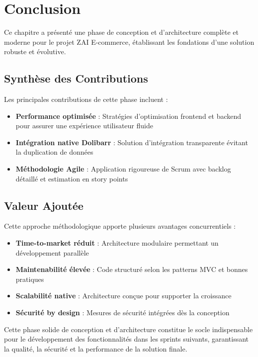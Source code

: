 \documentclass[12pt,a4paper]{report}
\begin{document}
\section{Conclusion}
Ce chapitre a présenté une phase de conception et d'architecture complète et moderne pour le projet ZAI E-commerce, établissant les fondations d'une solution robuste et évolutive.

\subsection{Synthèse des Contributions}
Les principales contributions de cette phase incluent :

\begin{itemize}
    \item \textbf{Performance optimisée} : Stratégies d'optimisation frontend et backend pour assurer une expérience utilisateur fluide
    \item \textbf{Intégration native Dolibarr} : Solution d'intégration transparente évitant la duplication de données
    \item \textbf{Méthodologie Agile} : Application rigoureuse de Scrum avec backlog détaillé et estimation en story points
  
\end{itemize}

\subsection{Valeur Ajoutée}
Cette approche méthodologique apporte plusieurs avantages concurrentiels :

\begin{itemize}
    \item \textbf{Time-to-market réduit} : Architecture modulaire permettant un développement parallèle
    \item \textbf{Maintenabilité élevée} : Code structuré selon les patterns MVC et bonnes pratiques
    \item \textbf{Scalabilité native} : Architecture conçue pour supporter la croissance
    \item \textbf{Sécurité by design} : Mesures de sécurité intégrées dès la conception
\end{itemize}

Cette phase solide de conception et d'architecture constitue le socle indispensable pour le développement des fonctionnalités dans les sprints suivants, garantissant la qualité, la sécurité et la performance de la solution finale.
\end{document}
